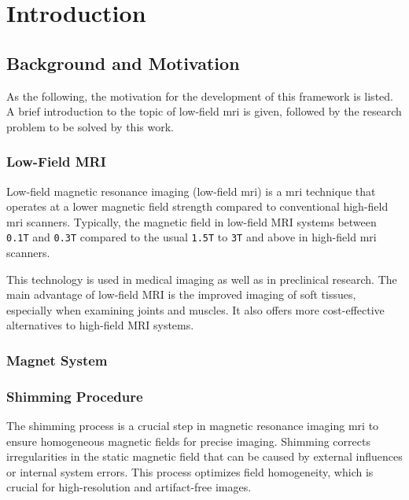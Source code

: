 \hypertarget{introduction}{%
\chapter{Introduction}\label{introduction}}

\hypertarget{background-and-motivation}{%
\section{Background and Motivation}\label{background-and-motivation}}

As the following, the motivation for the development of this framework
is listed. A brief introduction to the topic of low-field \gls{mri} is
given, followed by the research problem to be solved by this work.

\hypertarget{low-field-mri}{%
\subsection{Low-Field MRI}\label{low-field-mri}}

Low-field magnetic resonance imaging (low-field \gls{mri}) is a
\gls{mri} technique that operates at a lower magnetic field strength
compared to conventional high-field \gls{mri} scanners. Typically, the
magnetic field in low-field MRI systems between
\passthrough{\lstinline!0.1T!} and \passthrough{\lstinline!0.3T!}
compared to the usual \passthrough{\lstinline!1.5T!} to
\passthrough{\lstinline!3T!} and above in high-field \gls{mri}
scanners.\cite{Hori2021-pt}

This technology is used in medical imaging as well as in preclinical
research. The main advantage of low-field MRI is the improved imaging of
soft tissues, especially when examining joints and muscles. It also
offers more cost-effective alternatives to high-field MRI
systems.\cite{Hori2021-pt}

\hypertarget{magnet-system}{%
\subsection{Magnet System}\label{magnet-system}}

\hypertarget{shimming-procedure}{%
\subsection{Shimming Procedure}\label{shimming-procedure}}

The shimming process is a crucial step in magnetic resonance imaging
\gls{mri} to ensure homogeneous magnetic fields for precise imaging.
Shimming corrects irregularities in the static magnetic field that can
be caused by external influences or internal system errors. This process
optimizes field homogeneity, which is crucial for high-resolution and
artifact-free images.\cite{10.3389/fphy.2021.704566}

